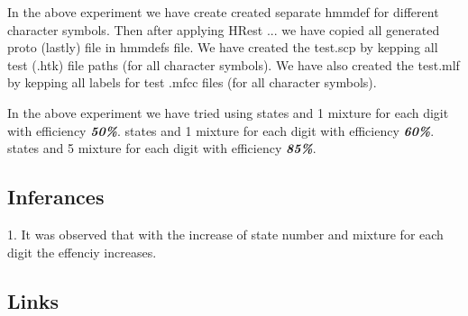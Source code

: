 \begin{flushleft}
    In the above experiment we have create created separate hmmdef for different character symbols.
  Then after applying HRest ...  we have copied all generated proto (lastly) file in hmmdefs file. 
  We have created the test.scp by kepping all test (.htk) file paths (for all character symbols).
  We have also created the test.mlf by kepping all labels for test .mfcc files (for all character symbols).
  
  In the above experiment we have tried using  states and 1 mixture for each digit with efficiency \textbf{\textit{50\%}}.  states and 1 mixture for each digit with efficiency \textbf{\textit{60\%}}.  states and 5 mixture for each digit with efficiency \textbf{\textit{85\%}}. \break
 \break
\end{flushleft}

\subsection{Inferances}
\begin{flushleft}
  1. It was observed that with the increase of state number and mixture for each digit the effenciy increases.
\end{flushleft}

\subsection{Links}
